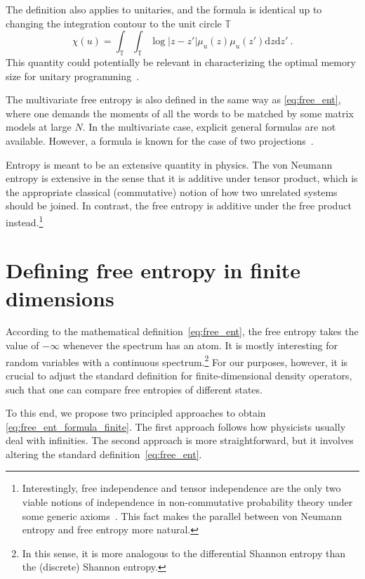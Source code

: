\documentclass[11pt,letterpaper]{article}
\newcommand{\dd}{\mathrm{d}}
\begin{document}
The definition also applies to unitaries, and the formula is identical up to changing the integration contour to the unit circle $\mathbb{T}$~\cite{hiai2000semicircle}
\begin{equation}\label{eq:free_ent_formula_unitary}
    \chi(u) = \int_{\mathbb{T}}\int_{\mathbb{T}} \log|z-z'| \mu_u(z) \mu_u(z') \dd z \dd z'\ .
\end{equation}
This quantity could potentially be relevant in characterizing the optimal memory size for unitary programming~\cite{yang2020optimal}.

The multivariate free entropy is also defined in the same way as \eqref{eq:free_ent}, where one demands the moments of all the words to be matched by some matrix models at large $N$. In the multivariate case, explicit general formulas are not available. However, a formula is known for the case of two projections~\cite{hiai2005large,hiai2006notes,hiai2006log}.

Entropy is meant to be an extensive quantity in physics. The von Neumann entropy is extensive in the sense that it is additive under tensor product, which is the appropriate classical (commutative) notion of how two unrelated systems should be joined. In contrast, the free entropy is additive under the free product instead.\footnote{Interestingly, free independence and tensor independence are the only two viable notions of independence in non-commutative probability theory under some generic axioms~\cite{speicher1996universal,muraki2002five}. This fact makes the parallel between von Neumann entropy and free entropy more natural.} \\

\section{Defining free entropy in finite dimensions}
According to the mathematical definition~\eqref{eq:free_ent}, the free entropy takes the value of $-\infty$ whenever the spectrum has an atom. It is mostly interesting for random variables with a continuous spectrum.\footnote{In this sense, it is more analogous to the differential Shannon entropy than the (discrete) Shannon entropy.} For our purposes, however, it is crucial to adjust the standard definition for finite-dimensional density operators, such that one can compare free entropies of different states. 

To this end, we propose two principled approaches to obtain \eqref{eq:free_ent_formula_finite}. The first approach follows how physicists usually deal with infinities. The second approach is more straightforward, but it involves altering the standard definition~\eqref{eq:free_ent}.
\end{document}
